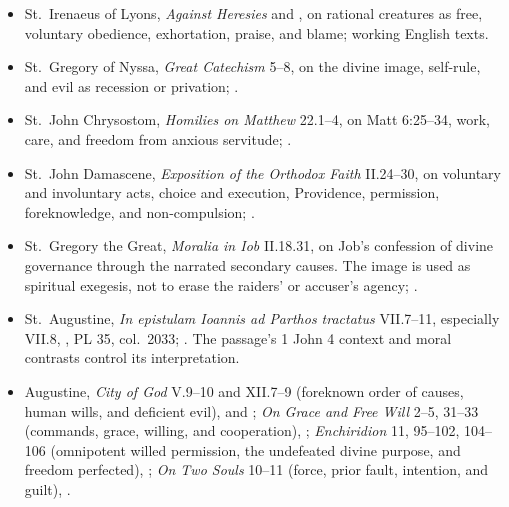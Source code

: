 {\fontsize{8.6}{9.6}\selectfont
\begin{itemize}[itemsep=0pt,parsep=0pt,topsep=0.05em]
\item St.~Irenaeus of Lyons, \emph{Against Heresies}  and , on rational creatures as free, voluntary obedience, exhortation, praise, and blame; working English texts.
\item St.~Gregory of Nyssa, \emph{Great Catechism} 5--8, on the divine image, self-rule, and evil as recession or privation; .
\item St.~John Chrysostom, \emph{Homilies on Matthew} 22.1--4, on Matt 6:25--34, work, care, and freedom from anxious servitude; .
\item St.~John Damascene, \emph{Exposition of the Orthodox Faith} II.24--30, on voluntary and involuntary acts, choice and execution, Providence, permission, foreknowledge, and non-compulsion; .
\item St.~Gregory the Great, \emph{Moralia in Iob} II.18.31, on Job's confession of divine governance through the narrated secondary causes. The image is used as spiritual exegesis, not to erase the raiders' or accuser's agency; .
\item St.~Augustine, \emph{In epistulam Ioannis ad Parthos tractatus} VII.7--11, especially VII.8, , PL 35, col.~2033; . The passage's 1 John 4 context and moral contrasts control its interpretation.
\item Augustine, \emph{City of God} V.9--10 and XII.7--9 (foreknown order of causes, human wills, and deficient evil),  and ; \emph{On Grace and Free Will} 2--5, 31--33 (commands, grace, willing, and cooperation), ; \emph{Enchiridion} 11, 95--102, 104--106 (omnipotent willed permission, the undefeated divine purpose, and freedom perfected), ; \emph{On Two Souls} 10--11 (force, prior fault, intention, and guilt), .
\end{itemize}}

